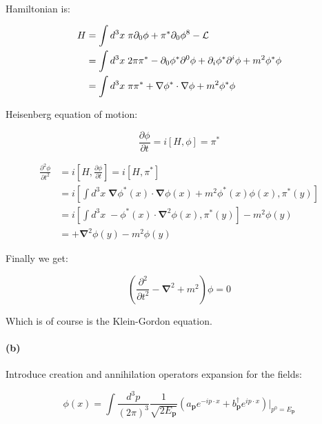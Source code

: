 \documentclass[11pt]{article}
\begin{document}
\

Hamiltonian is:

\begin{equation}
\begin{split}
H & =
  \int d^3x \; \pi \partial_0 \phi + \pi^* \partial_0 \phi^8 -
    {\cal{L}} \\
  & =
  \int d^3x \; 2 \pi \pi^* - \partial_0 \phi^* \partial^0 \phi +
    \partial_i \phi^* \partial^i \phi + m^2 \phi^* \phi \\
  & = \int d^3x \; \pi \pi^* +
    \mathbf{\nabla} \phi^* \cdot \mathbf{\nabla} \phi +
    m^2 \phi^* \phi
\end{split}
\end{equation}

Heisenberg equation of motion:

\begin{equation}
\frac{\partial \phi}{\partial t} = i [ H, \phi ] =
  \pi^*
\end{equation}

\begin{equation}
\begin{split}
\frac{\partial^2 \phi}{\partial t^2} & =
  i[ H, \frac{\partial \phi}{\partial t} ] =
  i[ H, \pi^*] \\
  & = i \left[
    \int d^3x \;
      \mathbf{\nabla} \phi^*(x) \cdot \mathbf{\nabla} \phi(x) +
      m^2 \phi^*(x) \phi(x),
    \pi^*(y) \right] \\
  & = i \left[
    \int d^3x \;
      -\phi^*(x) \cdot \mathbf{\nabla}^2 \phi(x),
    \pi^*(y) \right] - m^2 \phi(y) \\
  & = + \mathbf{\nabla}^2 \phi(y) - m^2 \phi(y)
\end{split}
\end{equation}

Finally we get:

\begin{equation}
\left( \frac{\partial^2}{\partial t^2} - \mathbf{\nabla}^2 +
  m^2 \right) \phi = 0
\end{equation}

Which is of course is the Klein-Gordon equation.

\paragraph*{(b)}

Introduce creation and annihilation operators expansion for the
fields:

\begin{equation}
\phi(x) = \int \frac{d^3p}{(2 \pi)^3}
  \frac{1}{ \sqrt{ 2 E_\mathbf{p} } }
  \left( a_\mathbf{p} e^{-i p \cdot x} +
         b^\dagger_\mathbf{p} e^{i p \cdot x}
         \right) \bigg\rvert_{p^0 = E_\mathbf{p}}
\end{equation}
\end{document}
